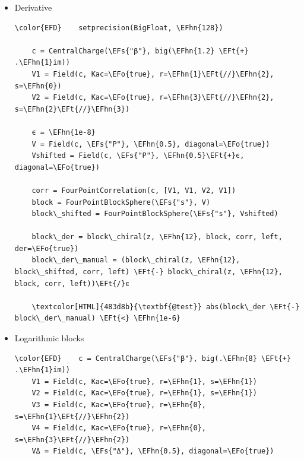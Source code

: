 \documentclass[a4paper]{article}
\numberwithin{equation}{section}
\newcommand{\EFc}[1]{\textcolor{EFc}{#1}} %
\newcommand{\EFcd}[1]{\textcolor{EFcd}{#1}} %
\newcommand{\EFs}[1]{\textcolor{EFs}{#1}} %
\newcommand{\EFt}[1]{\textcolor{EFt}{#1}} %
\newcommand{\EFo}[1]{\textcolor{EFo}{#1}} %
\newcommand{\EFhn}[1]{\textcolor{EFhn}{#1}} %
\begin{document}
\begin{itemize}
\begin{Code}
\begin{Verbatim}
    \textcolor[HTML]{483d8b}{\textbf{@test}} abs(\EFhn{1}\EFt{-}block\_non\_chiral(z, \EFhn{12}, block\_s, corr)\EFt{*}z\EFt{\char94{}}Δ\EFt{*}conj(z)\EFt{\char94{}}Δ) \EFt{<} \EFhn{1e-5}
    \textcolor[HTML]{483d8b}{\textbf{@test}} abs(\EFhn{1}\EFt{-}block\_non\_chiral(\EFhn{1}\EFt{-}z, \EFhn{12}, block\_t, corr)\EFt{*}z\EFt{\char94{}}Δ\EFt{*}conj(z)\EFt{\char94{}}Δ) \EFt{<} \EFhn{1e-5} \EFcd{\#} \EFc{both blocks are close to one}

\end{Verbatim}
\end{Code}
\item Derivative
\label{sec:orged6874d}

\begin{Code}
\begin{Verbatim}
\color{EFD}    setprecision(BigFloat, \EFhn{128})

    c = CentralCharge(\EFs{"β"}, big(\EFhn{1.2} \EFt{+} .\EFhn{1}im))
    V1 = Field(c, Kac=\EFo{true}, r=\EFhn{1}\EFt{//}\EFhn{2}, s=\EFhn{0})
    V2 = Field(c, Kac=\EFo{true}, r=\EFhn{3}\EFt{//}\EFhn{2}, s=\EFhn{2}\EFt{//}\EFhn{3})

    ϵ = \EFhn{1e-8}
    V = Field(c, \EFs{"P"}, \EFhn{0.5}, diagonal=\EFo{true})
    Vshifted = Field(c, \EFs{"P"}, \EFhn{0.5}\EFt{+}ϵ, diagonal=\EFo{true})

    corr = FourPointCorrelation(c, [V1, V1, V2, V1])
    block = FourPointBlockSphere(\EFs{"s"}, V)
    block\_shifted = FourPointBlockSphere(\EFs{"s"}, Vshifted)

    block\_der = block\_chiral(z, \EFhn{12}, block, corr, left, der=\EFo{true})
    block\_der\_manual = (block\_chiral(z, \EFhn{12}, block\_shifted, corr, left) \EFt{-} block\_chiral(z, \EFhn{12}, block, corr, left))\EFt{/}ϵ

    \textcolor[HTML]{483d8b}{\textbf{@test}} abs(block\_der \EFt{-} block\_der\_manual) \EFt{<} \EFhn{1e-6}
\end{Verbatim}
\end{Code}
\item Logarithmic blocks
\label{sec:org8cd4429}

\begin{Code}
\begin{Verbatim}
\color{EFD}    c = CentralCharge(\EFs{"β"}, big(.\EFhn{8} \EFt{+} .\EFhn{1}im))
    V1 = Field(c, Kac=\EFo{true}, r=\EFhn{1}, s=\EFhn{1})
    V2 = Field(c, Kac=\EFo{true}, r=\EFhn{1}, s=\EFhn{1})
    V3 = Field(c, Kac=\EFo{true}, r=\EFhn{0}, s=\EFhn{1}\EFt{//}\EFhn{2})
    V4 = Field(c, Kac=\EFo{true}, r=\EFhn{0}, s=\EFhn{3}\EFt{//}\EFhn{2})
    VΔ = Field(c, \EFs{"Δ"}, \EFhn{0.5}, diagonal=\EFo{true})


\end{Verbatim}
\end{Code}
\end{itemize}
\end{document}
